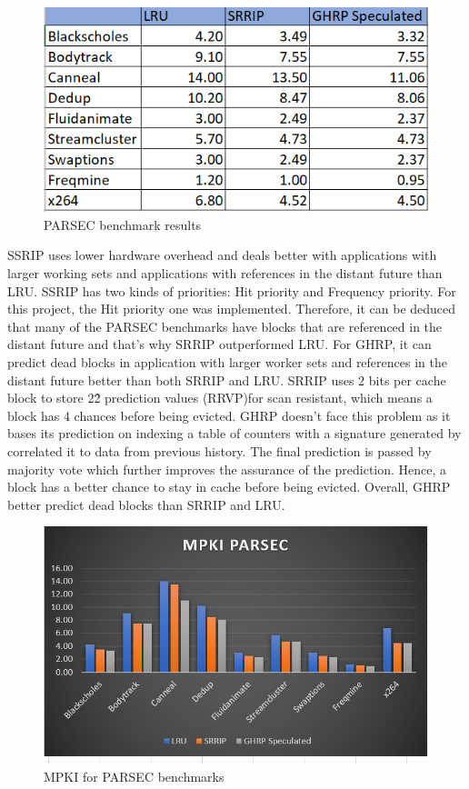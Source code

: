\documentclass[11pt]{article}
\begin{document}
\begin{figure}[h]
	\caption{PARSEC benchmark results}
	\label{figs:fig3}
	\includegraphics[width=1\textwidth]{MPKI1.PNG}
\end{figure}


 SSRIP uses lower hardware overhead and deals better with applications with larger working sets and applications with references in the distant future than LRU. SSRIP has two 
kinds of priorities: Hit priority and Frequency priority. 
For this project, the Hit priority one was implemented. Therefore, it can be deduced that many of the PARSEC 
benchmarks have blocks that are referenced in the distant future and that’s why SRRIP outperformed LRU. For GHRP, it can predict dead blocks in application with larger worker 
sets and references in the distant future better than both SRRIP and LRU. SRRIP uses 2 bits per cache block to store 2\^2 prediction values (RRVP)for scan resistant, which means
a block has 4 chances before being evicted. GHRP doesn’t face this problem as it bases its prediction on indexing a table of counters with a signature generated by correlated 
it to data from previous history. The final prediction is passed by majority vote which further improves the assurance of the prediction. Hence, a block has a better chance to 
stay in cache before being evicted. 
Overall, GHRP better predict dead blocks than SRRIP and LRU. 



\begin{figure}[h]
	\caption{MPKI for PARSEC benchmarks}
	\label{figs:fig4}
	\includegraphics[width=1\textwidth]{MPKI2.PNG}
\end{figure}
\end{document}
